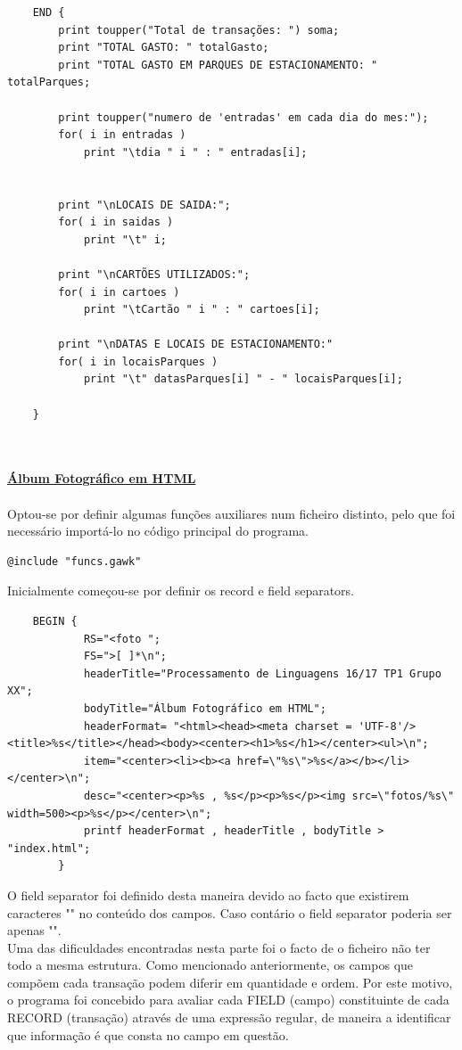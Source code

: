 \documentclass{report}
\begin{document}
\begin{verbatim}
	END {
		print toupper("Total de transações: ") soma;
		print "TOTAL GASTO: " totalGasto;
		print "TOTAL GASTO EM PARQUES DE ESTACIONAMENTO: " totalParques;

		print toupper("numero de 'entradas' em cada dia do mes:");
		for( i in entradas )
	    	print "\tdia " i " : " entradas[i];


		print "\nLOCAIS DE SAIDA:";
		for( i in saidas )
	    	print "\t" i;

		print "\nCARTÕES UTILIZADOS:";
		for( i in cartoes )
	    	print "\tCartão " i " : " cartoes[i];

		print "\nDATAS E LOCAIS DE ESTACIONAMENTO:"
		for( i in locaisParques )
	    	print "\t" datasParques[i] " - " locaisParques[i];

	}
\end{verbatim}
\\
\\
\textbf{\underline{Álbum Fotográfico em HTML}}
\\
\\
Optou-se por definir algumas funções auxiliares num ficheiro distinto, pelo que foi necessário importá-lo no código principal do programa.
\begin{verbatim}
@include "funcs.gawk"
\end{verbatim}
Inicialmente começou-se por definir os record e field separators.
\begin{verbatim}
	BEGIN {
	    	RS="<foto ";
	    	FS=">[ ]*\n";
	    	headerTitle="Processamento de Linguagens 16/17 TP1 Grupo XX";
	    	bodyTitle="Álbum Fotográfico em HTML";
	    	headerFormat= "<html><head><meta charset = 'UTF-8'/><title>%s</title></head><body><center><h1>%s</h1></center><ul>\n";
	    	item="<center><li><b><a href=\"%s\">%s</a></b></li></center>\n";
	    	desc="<center><p>%s , %s</p><p>%s</p><img src=\"fotos/%s\" width=500><p>%s</p></center>\n";
	    	printf headerFormat , headerTitle , bodyTitle > "index.html";
		}
\end{verbatim}
O field separator foi definido desta maneira devido ao facto que existirem caracteres "\n" no conteúdo dos campos. Caso contário o field separator poderia ser apenas "\n".
\\
Uma das dificuldades encontradas nesta parte foi o facto de o ficheiro não ter todo a mesma estrutura.
Como mencionado anteriormente, os campos que compõem cada transação podem diferir em quantidade e ordem. Por este motivo, o programa foi concebido para avaliar cada FIELD (campo) constituinte de cada RECORD (transação) através de uma expressão regular, de maneira a identificar que informação é que consta no campo em questão.
\end{document}
